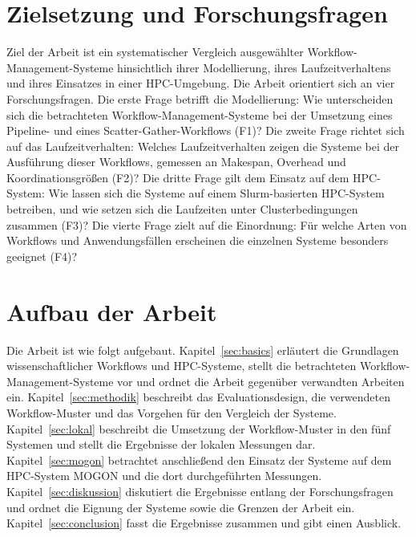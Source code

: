 \section{Zielsetzung und Forschungsfragen}
\label{sec:intro:goal}
Ziel der Arbeit ist ein systematischer Vergleich ausgewählter
Workflow-Management-Systeme hinsichtlich ihrer Modellierung,
ihres Laufzeitverhaltens und ihres Einsatzes in einer
HPC-Umgebung. Die Arbeit orientiert sich an vier
Forschungsfragen. Die erste Frage betrifft die Modellierung:
Wie unterscheiden sich die betrachteten
Workflow-Management-Systeme bei der Umsetzung eines Pipeline- und
eines Scatter-Gather-Workflows (F1)? Die zweite Frage richtet sich
auf das Laufzeitverhalten: Welches Laufzeitverhalten zeigen die Systeme
bei der Ausführung dieser Workflows, gemessen an Makespan, Overhead und Koordinationsgrößen (F2)? Die
dritte Frage gilt dem Einsatz auf dem HPC-System: Wie lassen sich
die Systeme auf einem Slurm-basierten HPC-System betreiben, und
wie setzen sich die Laufzeiten unter Clusterbedingungen zusammen
(F3)? Die vierte Frage zielt auf die Einordnung: Für welche Arten
von Workflows und Anwendungsfällen erscheinen die einzelnen
Systeme besonders geeignet (F4)?

\section{Aufbau der Arbeit}
\label{sec:intro:structure}
Die Arbeit ist wie folgt aufgebaut.
Kapitel~\ref{sec:basics} erläutert die Grundlagen wissenschaftlicher
Workflows und HPC-Systeme, stellt die betrachteten
Workflow-Management-Systeme vor und ordnet die Arbeit gegenüber
verwandten Arbeiten ein. Kapitel~\ref{sec:methodik} beschreibt das
Evaluationsdesign, die verwendeten Workflow-Muster und das Vorgehen
für den Vergleich der Systeme. Kapitel~\ref{sec:lokal} beschreibt
die Umsetzung der Workflow-Muster in den fünf Systemen und stellt
die Ergebnisse der lokalen Messungen dar.
Kapitel~\ref{sec:mogon} betrachtet anschließend den Einsatz der
Systeme auf dem HPC-System MOGON und die dort durchgeführten
Messungen. Kapitel~\ref{sec:diskussion} diskutiert die Ergebnisse
entlang der Forschungsfragen und ordnet die Eignung der Systeme
sowie die Grenzen der Arbeit ein. Kapitel~\ref{sec:conclusion}
fasst die Ergebnisse zusammen und gibt einen Ausblick.
